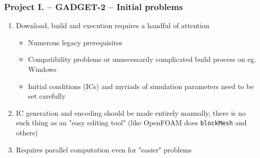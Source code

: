 \begin{frame}
\frametitle{Project I. -- GADGET-2 -- Initial problems}

\begin{enumerate}
	\item<1-> Download, build and execution requires a handful of attention
	\begin{itemize}
		\item<2-> Numerous legacy prerequisites
		\item<2-> Compatibility problems or unnecessarily complicated build process on eg. Windows
		\item<2-> Initial conditions (ICs) and myriads of simulation parameters need to be set carefully
	\end{itemize}
	\item<3-> IC generation and encoding should be made entirely manually, there is no such thing as an "easy editing tool" (like OpenFOAM does \texttt{blockMesh} and others)
	\item<4-> Requires parallel computation even for "easier" problems
\end{enumerate}

\end{frame}